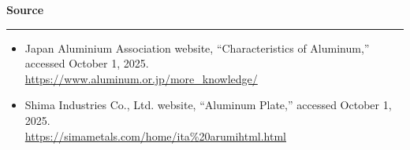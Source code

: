 \documentclass[10.5pt, a4paper]{article}
\begin{document}
\vspace{1cm} %

\noindent\large{\textbf{Source}}
\hrule
\vspace{0.3cm}
\begin{itemize}
    \item Japan Aluminium Association website, ``Characteristics of Aluminum,'' accessed October 1, 2025.\\
    \url{https://www.aluminum.or.jp/more_knowledge/}
    \item Shima Industries Co., Ltd. website, ``Aluminum Plate,'' accessed October 1, 2025. \\\url{https://simametals.com/home/ita%20arumihtml.html}
\end{itemize}
\end{document}
